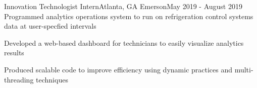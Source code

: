 \resumeSubheading
{Innovation Technologist Intern}{Atlanta, GA}
{Emerson}{May 2019 - August 2019}
\resumeItemListStart
\resumeItem
{
    Programmed analytics operations system to run on refrigeration control systems data at
    user-specfied intervals
}

\resumeItem
{
    Developed a web-based dashboard for technicians to easily visualize analytics results
}

\resumeItem
{
    Produced scalable code to improve efficiency using dynamic practices and
    multi-threading techniques
}

\resumeItemListEnd
